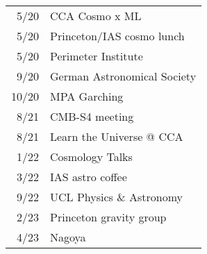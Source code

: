 \begin{tabular}{r l}
 5/20 & CCA Cosmo x ML \\
 5/20 & Princeton/IAS cosmo lunch \\
 5/20 & Perimeter Institute \\
 9/20 & German Astronomical Society \\
10/20 & MPA Garching \\
 8/21 & CMB-S4 meeting \\
 8/21 & Learn the Universe @ CCA \\
 1/22 & Cosmology Talks \\
 3/22 & IAS astro coffee \\
 9/22 & UCL Physics \& Astronomy \\
 2/23 & Princeton gravity group \\
 4/23 & Nagoya
\end{tabular}
